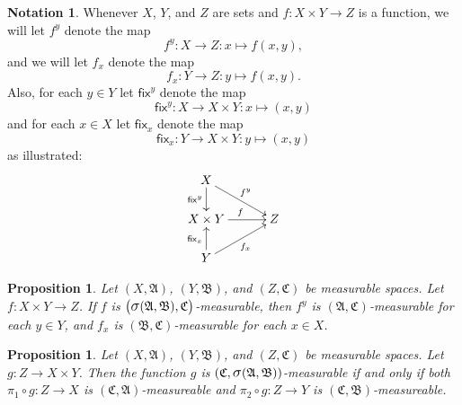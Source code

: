 \documentclass[
twoside=true,
paper=letter,
fontsize=9pt,
pagesize=auto,
leqno,
openany,
headsepline,
overfullrule,
]{scrbook}
\theoremstyle{plain}
\theoremstyle{plain}
\newtheorem{prop}[thm]{Proposition}
\theoremstyle{definition}
\newtheorem{notn}[thm]{Notation}
\theoremstyle{bfnoteitalic}
\theoremstyle{bfnoteroman}
\newcommand{\sigalg}[1]{\mathfrak{#1}}
\newcommand{\sfop}[1]{\mathsf{#1}}
\newcommand{\sagb}{\mathop{\hbox{\large{$\sigma$}}}\nolimits}
\newcommand{\sigmaalgebra}{\sigalg{A}}
\newcommand{\sigmaalgebraii}{\sigalg{B}}
\newcommand{\sigmaalgebraiii}{\sigalg{C}}
\newcommand{\productsig}[2]{\sagb(#1,#2)}
\newcommand{\funcg}{g}
\newcommand{\function}{f}
\newcommand{\measurespace}{X}
\newcommand{\measurespaceii}{Y}
\newcommand{\measurespaceiii}{Z}
\newcommand{\mspaceelt}{x}
\newcommand{\mspaceeltii}{y}
\newcommand{\projectionone}{\pi_1}
\newcommand{\projectiontwo}{\pi_2}
\newcommand{\fixinthefirst}[1]{\sfop{fix}_{#1}}
\newcommand{\fixinthesecond}[1]{\sfop{fix}^{#1}}
\begin{document}
\begin{notn}
Whenever $\measurespace$, $\measurespaceii$, and 
$\measurespaceiii$ are sets and 
$\function
:\measurespace\times\measurespaceii\to\measurespaceiii$ is a function, we will let 
$\function^\mspaceeltii$ denote the map
\[
\function^\mspaceeltii
:\measurespace\to\measurespaceiii: 
\mspaceelt \mapsto \function(\mspaceelt,\mspaceeltii),
\]
and we will let $\function_\mspaceelt$ denote the map
\[
\function_\mspaceelt
:\measurespaceii\to\measurespaceiii: 
\mspaceeltii \mapsto \function(\mspaceelt,\mspaceeltii).
\]
Also, for each $\mspaceeltii\in\measurespaceii$ let
$\fixinthesecond{\mspaceeltii}$ denote the map
\[
\fixinthesecond{\mspaceeltii}
:\measurespace\to\measurespace\times\measurespaceii
:\mspaceelt\mapsto (\mspaceelt,\mspaceeltii)
\]
and for each $\mspaceelt\in\measurespace$ let
$\fixinthefirst{\mspaceelt}$ denote the map
\[
\fixinthefirst{\mspaceelt}
:\measurespaceii\to\measurespace\times\measurespaceii
:\mspaceeltii\mapsto (\mspaceelt,\mspaceeltii)
\]
as illustrated:
\[
\xymatrix@R=18pt@C=30pt{ 
\measurespace \ar[d]_-{\fixinthesecond{\mspaceeltii}}
\ar[dr]^{\function^\mspaceeltii}
\\
\measurespace\times \measurespaceii
\ar[r]^{\function} & \measurespaceiii
\\
\measurespaceii
\ar[ur]_{\function_\mspaceelt}
\ar[u]^{\fixinthefirst{\mspaceelt}} & \\
}
\]
\end{notn}
 
 
\begin{prop}\label{measurable_out_of_product}
Let 
$(\measurespace,\sigmaalgebra)$,
$(\measurespaceii,\sigmaalgebraii)$, and
$(\measurespaceiii,\sigmaalgebraiii)$
be measurable spaces. 
Let 
$\function
:\measurespace\times\measurespaceii\to\measurespaceiii$.
If $\function$ is 
$\bigl(
\productsig{\sigmaalgebra}{\sigmaalgebraii},
\sigmaalgebraiii
\bigr)$\hyp{}measurable, then
$\function^\mspaceeltii$ is 
$(\sigmaalgebra,\sigmaalgebraiii)$\hyp{}measurable for each 
$\mspaceeltii\in\measurespaceii$, and
$\function_\mspaceelt$ is
$(\sigmaalgebraii,\sigmaalgebraiii)$\hyp{}measurable for each 
$\mspaceelt\in\measurespace$.
\end{prop}
 

\begin{prop}\label{measurable_into_product}
Let
$(\measurespace,\sigmaalgebra)$,
$(\measurespaceii,\sigmaalgebraii)$, and
$(\measurespaceiii,\sigmaalgebraiii)$
be measurable spaces.
Let
$\funcg
:\measurespaceiii \to \measurespace\times\measurespaceii$.
Then the function $\funcg$ is
$(\sigmaalgebraiii, \productsig{\sigmaalgebra}{\sigmaalgebraii} )$\hyp{}measurable
if and only if both
$\projectionone\circ\funcg : \measurespaceiii \to \measurespace$
is $(\sigmaalgebraiii,\sigmaalgebra)$\hyp{}measureable
and
$\projectiontwo\circ\funcg : \measurespaceiii \to \measurespaceii$
is $(\sigmaalgebraiii,\sigmaalgebraii)$\hyp{}measureable.
\end{prop}
\end{document}
